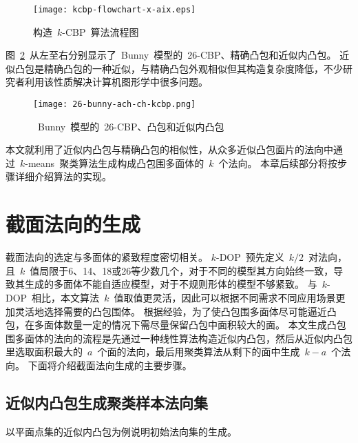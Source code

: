 \begin{figure}[htbp]
    \centering
    \texttt{[image: kcbp-flowchart-x-aix.eps]}
    \caption{构造~$k$-CBP~算法流程图}
    \label{lbl:kcbp-algorithm-flowchart}
\end{figure}

图~\ref{lbl:bunny-26-cbp-ch-ach}~从左至右分别显示了~Bunny~模型的~26-CBP、精确凸包和近似内凸包。
近似凸包是精确凸包的一种近似，与精确凸包外观相似但其构造复杂度降低，不少研究者利用该性质解决计算机图形学中很多问题\cite{hossain2013constructing}。

\begin{figure}[htbp] %
\centering
\texttt{[image: 26-bunny-ach-ch-kcbp.png]}
\caption{~Bunny~模型的~26-CBP、凸包和近似内凸包}
\label{lbl:bunny-26-cbp-ch-ach}
\end{figure}

本文就利用了近似内凸包与精确凸包的相似性，从众多近似凸包面片的法向中通过~$k$-means~聚类算法生成构成凸包围多面体的~$k$~个法向。
本章后续部分将按步骤详细介绍算法的实现。

\section{截面法向的生成}
\label{sec:gen-normals}

截面法向的选定与多面体的紧致程度密切相关。
$k$-DOP\cite{klosowski1998efficient}~预先定义~$k/2$~对法向，且~$k$~值局限于6、14、18或26等少数几个，对于不同的模型其方向始终一致，导致其生成的多面体不能自适应模型，对于不规则形体的模型不够紧致。
与~$k$-DOP~相比，本文算法~$k$~值取值更灵活，因此可以根据不同需求不同应用场景更加灵活地选择需要的凸包围体。
根据经验，为了使凸包围多面体尽可能逼近凸包，在多面体数量一定的情况下需尽量保留凸包中面积较大的面。 
本文生成凸包围多面体的法向的流程是先通过一种线性算法\cite{bentley1982approximation}构造近似内凸包，然后从近似内凸包里选取面积最大的~$a$~个面的法向，最后用聚类算法从剩下的面中生成~$k-a$~个法向。
下面将介绍截面法向生成的主要步骤。

\subsection{近似内凸包生成聚类样本法向集}
\label{subsec:ach-gen-normals}

以平面点集的近似内凸包为例说明初始法向集的生成。

